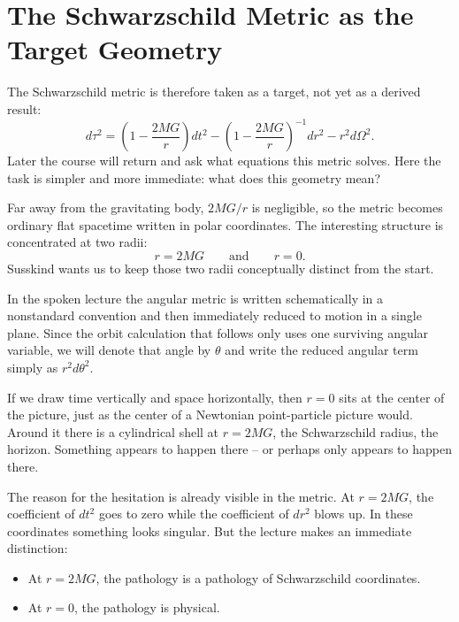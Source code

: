 \section{The Schwarzschild Metric as the Target Geometry}

The Schwarzschild metric is therefore taken as a target, not yet as a derived result:
\begin{equation}
d\tau^{2}
=
\left(1-\frac{2MG}{r}\right)dt^{2}
-
\left(1-\frac{2MG}{r}\right)^{-1}dr^{2}
-
r^{2}d\Omega^{2}.
\end{equation}
Later the course will return and ask what equations this metric solves. Here the task is simpler and more immediate: what does this geometry mean?

Far away from the gravitating body, \(2MG/r\) is negligible, so the metric becomes ordinary flat spacetime written in polar coordinates. The interesting structure is concentrated at two radii:
\begin{equation}
r=2MG
\qquad \text{and} \qquad
r=0.
\end{equation}
Susskind wants us to keep those two radii conceptually distinct from the start.

\begin{remark}
In the spoken lecture the angular metric is written schematically in a nonstandard convention and then immediately reduced to motion in a single plane. Since the orbit calculation that follows only uses one surviving angular variable, we will denote that angle by \(\theta\) and write the reduced angular term simply as \(r^{2}d\theta^{2}\).
\end{remark}

If we draw time vertically and space horizontally, then \(r=0\) sits at the center of the picture, just as the center of a Newtonian point-particle picture would. Around it there is a cylindrical shell at \(r=2MG\), the Schwarzschild radius, the horizon. Something appears to happen there -- or perhaps only appears to happen there.

The reason for the hesitation is already visible in the metric. At \(r=2MG\), the coefficient of \(dt^{2}\) goes to zero while the coefficient of \(dr^{2}\) blows up. In these coordinates something looks singular. But the lecture makes an immediate distinction:
\begin{itemize}
\item At \(r=2MG\), the pathology is a pathology of Schwarzschild coordinates.
\item At \(r=0\), the pathology is physical.
\end{itemize}

